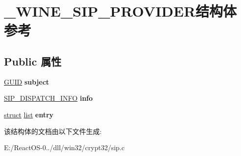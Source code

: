 \hypertarget{struct___w_i_n_e___s_i_p___p_r_o_v_i_d_e_r}{}\section{\+\_\+\+W\+I\+N\+E\+\_\+\+S\+I\+P\+\_\+\+P\+R\+O\+V\+I\+D\+E\+R结构体 参考}
\label{struct___w_i_n_e___s_i_p___p_r_o_v_i_d_e_r}
\subsection*{Public 属性}
\begin{DoxyCompactItemize}
\item 
\mbox{\label{struct___w_i_n_e___s_i_p___p_r_o_v_i_d_e_r_af8fc5a11b00728cb022b992fc17cc346}} 
\hyperlink{interface_g_u_i_d}{G\+U\+ID} {\bfseries subject}
\item 
\mbox{\label{struct___w_i_n_e___s_i_p___p_r_o_v_i_d_e_r_ac324d6b09b09b07f91d981823acf663f}} 
\hyperlink{struct_s_i_p___d_i_s_p_a_t_c_h___i_n_f_o__}{S\+I\+P\+\_\+\+D\+I\+S\+P\+A\+T\+C\+H\+\_\+\+I\+N\+FO} {\bfseries info}
\item 
\mbox{\label{struct___w_i_n_e___s_i_p___p_r_o_v_i_d_e_r_a58d706cdfdbf44e8072c40ce3b1106e2}} 
\hyperlink{interfacestruct}{struct} \hyperlink{classlist}{list} {\bfseries entry}
\end{DoxyCompactItemize}


该结构体的文档由以下文件生成\+:\begin{DoxyCompactItemize}
\item 
E\+:/\+React\+O\+S-\/0../dll/win32/crypt32/sip.\+c\end{DoxyCompactItemize}
